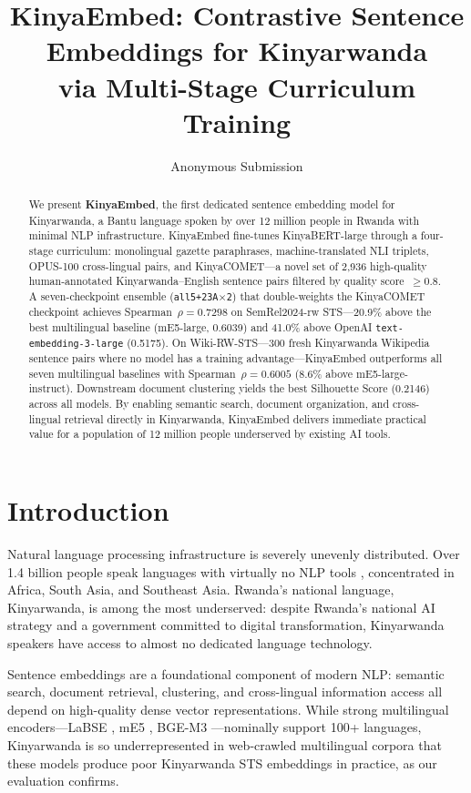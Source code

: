 \documentclass[letterpaper]{article} %
\title{KinyaEmbed: Contrastive Sentence Embeddings for Kinyarwanda\\
via Multi-Stage Curriculum Training}
\author{Anonymous Submission}
\begin{document}
\maketitle

\begin{abstract}
We present \textbf{KinyaEmbed}, the first dedicated sentence embedding model
for Kinyarwanda, a Bantu language spoken by over 12 million people in Rwanda
with minimal NLP infrastructure. KinyaEmbed fine-tunes KinyaBERT-large
through a four-stage curriculum: monolingual gazette paraphrases,
machine-translated NLI triplets, OPUS-100 cross-lingual pairs, and
KinyaCOMET---a novel set of 2{,}936 high-quality human-annotated
Kinyarwanda--English sentence pairs filtered by quality score~$\geq 0.8$.
A seven-checkpoint ensemble (\texttt{all5+23A$\times$2}) that double-weights
the KinyaCOMET checkpoint achieves Spearman~$\rho = 0.7298$ on SemRel2024-rw
STS---20.9\% above the best multilingual baseline (mE5-large, 0.6039) and
41.0\% above OpenAI \texttt{text-embedding-3-large} (0.5175). On
Wiki-RW-STS---300 fresh Kinyarwanda Wikipedia sentence pairs where no model
has a training advantage---KinyaEmbed outperforms all seven multilingual
baselines with Spearman~$\rho = 0.6005$ (8.6\% above mE5-large-instruct).
Downstream document clustering yields the best Silhouette Score (0.2146)
across all models. By enabling semantic search, document organization, and
cross-lingual retrieval directly in Kinyarwanda, KinyaEmbed delivers
immediate practical value for a population of 12 million people underserved
by existing AI tools.
\end{abstract}

\section{Introduction}

Natural language processing infrastructure is severely unevenly distributed.
Over 1.4 billion people speak languages with virtually no NLP tools
\cite{joshi-etal-2020-state}, concentrated in Africa, South Asia, and
Southeast Asia. Rwanda's national language, Kinyarwanda, is among the most
underserved: despite Rwanda's national AI strategy and a government committed
to digital transformation, Kinyarwanda speakers have access to almost no
dedicated language technology.

Sentence embeddings are a foundational component of modern NLP: semantic
search, document retrieval, clustering, and cross-lingual information access
all depend on high-quality dense vector representations. While strong
multilingual encoders---LaBSE \cite{feng-etal-2022-language}, mE5
\cite{wang2024multilingual}, BGE-M3 \cite{chen2024bge}---nominally support
100+ languages, Kinyarwanda is so underrepresented in web-crawled multilingual
corpora that these models produce poor Kinyarwanda STS embeddings in practice,
as our evaluation confirms.
\end{document}
